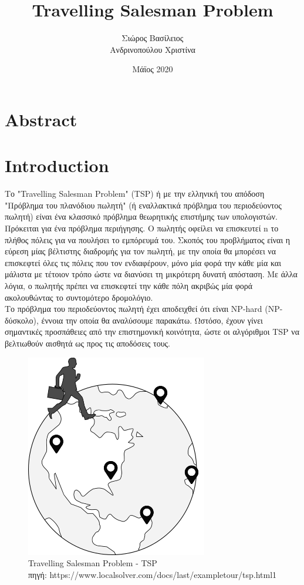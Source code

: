 \documentclass[oneside,12pt]{book}
\title{\huge Travelling Salesman Problem}
\author{Σιώρος Βασίλειος\\Ανδρινοπούλου Χριστίνα}
\date{Μάϊος 2020}
\newenvironment{matlab}
	{\begin{figure}[hp]\centering\captionsetup{justification=centering}}
	{\end{figure}}
\theoremstyle{definition}
\begin{document}
\maketitle
{}
\pagebreak
\tableofcontents

\chapter{Abstract}

\chapter{Introduction}

Το "Travelling Salesman Problem" (TSP) ή με την ελληνική του απόδοση "Πρόβλημα του πλανόδιου πωλητή" (ή εναλλακτικά πρόβλημα του περιοδεύοντος πωλητή) είναι ένα κλασσικό πρόβλημα θεωρητικής επιστήμης των  υπολογιστών. Πρόκειται για ένα πρόβλημα περιήγησης. Ο πωλητής οφείλει να επισκευτεί n το πλήθος πόλεις για να πουλήσει το εμπόρευμά του. Σκοπός του προβλήματος είναι η εύρεση μίας βέλτιστης διαδρομής για τον πωλητή, με την οποία θα μπορέσει να επισκεφτεί όλες τις πόλεις που τον ενδιαφέρουν, μόνο μία φορά την κάθε μία και μάλιστα με τέτοιον τρόπο ώστε να διανύσει τη μικρότερη δυνατή απόσταση. Με άλλα λόγια, ο πωλητής πρέπει να επισκεφτεί την κάθε πόλη ακριβώς μία φορά ακολουθώντας το συντομότερο δρομολόγιο. \\

Το πρόβλημα του περιοδεύοντος πωλητή έχει αποδειχθεί ότι είναι NP-hard (NP-δύσκολο), έννοια την οποία θα αναλύσουμε παρακάτω. Ωστόσο, έχουν γίνει σημαντικές προσπάθειες από την επιστημονική κοινότητα, ώστε οι αλγόριθμοι TSP να βελτιωθούν αισθητά ως προς τις αποδόσεις τους. \\

\begin{matlab}
	\includegraphics[scale=0.8]{images/tsp.png}
	\caption{Travelling Salesman Problem - TSP \\ πηγή: https://www.localsolver.com/docs/last/exampletour/tsp.html1}
\end{matlab}
\end{document}
